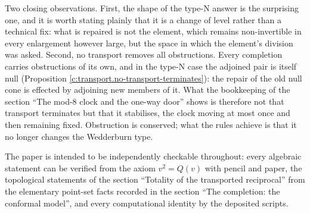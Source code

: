 \documentclass[11pt]{article}
\theoremstyle{definition}
\theoremstyle{plain}
\begin{document}
Two closing observations. First, the shape of the type-N answer is the surprising one, and it is worth stating plainly that it is a change of level rather than a technical fix: what is repaired is not the element, which remains non-invertible in every enlargement however large, but the space in which the element's division was asked. Second, no transport removes all obstructions. Every completion carries obstructions of its own, and in the type-N case the adjoined pair is itself null (Proposition \ref{c:transport.no-transport-terminates}): the repair of the old null cone is effected by adjoining new members of it. What the bookkeeping of the section ``The mod-8 clock and the one-way door'' shows is therefore not that transport terminates but that it stabilises, the clock moving at most once and then remaining fixed. Obstruction is conserved; what the rules achieve is that it no longer changes the Wedderburn type.

The paper is intended to be independently checkable throughout: every algebraic statement can be verified from the axiom $v^2 = Q(v)$ with pencil and paper, the topological statements of the section ``Totality of the transported reciprocal'' from the elementary point-set facts recorded in the section ``The completion: the conformal model'', and every computational identity by the deposited scripts.
\end{document}
